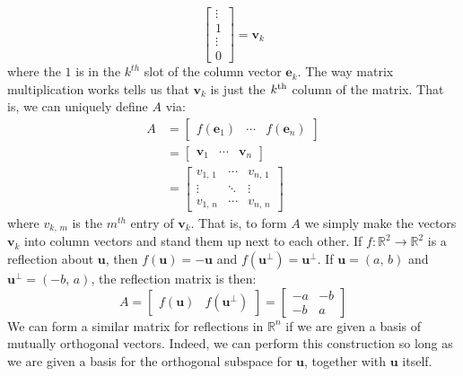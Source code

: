 \documentclass{article}
\theoremstyle{normal}
\newenvironment{example}{%
    \pushQED{\qed}\renewcommand{\qedsymbol}{$\blacksquare$}\examplex%
}{%
    \popQED\endexamplex%
}
\begin{document}
\begin{example}[\textbf{Reflection Matrix}]
\begin{equation}
\begin{bmatrix}
                \vdots\\
                1\\
                \vdots\\
                0
            \end{bmatrix}
            =\mathbf{v}_{k}
        \end{equation}
        where the $1$ is in the $k^{th}$ slot of the column vector
        $\mathbf{e}_{k}$. The way matrix multiplication works tells us that
        $\mathbf{v}_{k}$ is just the $k^{\small\textrm{th}}$
        column of the matrix. That is, we can uniquely define $A$ via:
        \begin{align}
            A&=
            \begin{bmatrix}
                f(\mathbf{e}_{1})&\cdots&f(\mathbf{e}_{n})
            \end{bmatrix}\\
            &=
            \begin{bmatrix}
                \mathbf{v}_{1}&\cdots&\mathbf{v}_{n}
            \end{bmatrix}\\
            &=
            \begin{bmatrix}
                v_{1,\,1}&\cdots&v_{n,\,1}\\
                \vdots&\ddots&\vdots\\
                v_{1,\,n}&\cdots&v_{n,\,n}
            \end{bmatrix}
        \end{align}
        where $v_{k,\,m}$ is the $m^{th}$ entry of $\mathbf{v}_{k}$. That is,
        to form $A$ we simply make the vectors $\mathbf{v}_{k}$ into column
        vectors and stand them up next to each other. If
        $f:\mathbb{R}^{2}\rightarrow\mathbb{R}^{2}$ is a reflection about
        $\mathbf{u}$, then $f(\mathbf{u})=-\mathbf{u}$ and
        $f(\mathbf{u}^{\perp})=\mathbf{u}^{\perp}$. If
        $\mathbf{u}=(a,\,b)$ and $\mathbf{u}^{\perp}=(-b,\,a)$, the reflection
        matrix is then:
        \begin{equation}
            A=
            \begin{bmatrix}
                f(\mathbf{u})&f(\mathbf{u}^{\perp})
            \end{bmatrix}
            =
            \begin{bmatrix}
                -a&-b\\
                -b&a
            \end{bmatrix}
        \end{equation}
        We can form a similar matrix for reflections in $\mathbb{R}^{n}$ if we
        are given a basis of mutually orthogonal vectors. Indeed, we can
        perform this construction so long as we are given a basis for
        the orthogonal subspace for $\mathbf{u}$, together with
        $\mathbf{u}$ itself.
    \end{example}
\end{document}
